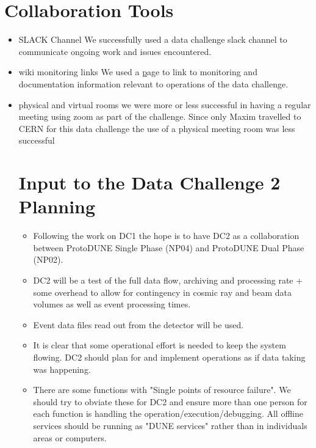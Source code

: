 \documentclass[pdftex,12pt,letter]{article}
\begin{document}
\section {Collaboration Tools}
\begin {itemize}
\item SLACK Channel
We successfully used a data challenge slack channel to communicate ongoing work and issues encountered. 
\item  wiki monitoring links
We used a
\href {wiki.dunescience.org} page to link to monitoring and documentation information relevant to operations of the data challenge. 
\item physical and virtual rooms 
we were more or less successful in having  a regular meeting using zoom as part of the challenge. Since only Maxim travelled to CERN for this data challenge the use of a physical meeting room was less successful

\section {Input to the Data Challenge 2 Planning}

\begin{itemize}
\item Following the work on DC1 the hope is to have DC2 as a collaboration between ProtoDUNE Single Phase (NP04) and ProtoDUNE Dual Phase (NP02). 

\item DC2 will be a test of the full data flow, archiving and processing rate + some overhead to allow for contingency in cosmic ray and beam data volumes as well as event processing times. 

\item Event data files read out from the detector will be used.

\item It is clear that some operational effort is needed to keep the system flowing. DC2 should plan for and implement operations as if data taking was happening. 

\item There are some functions with "Single points of resource failure". We should try to obviate these for DC2 and ensure more than one person for each function is handling the operation/execution/debugging. All offline services should be running as "DUNE services" rather than in individuals areas or computers. 


\end{itemize}



\end{itemize}



\clearpage
\end{document}
